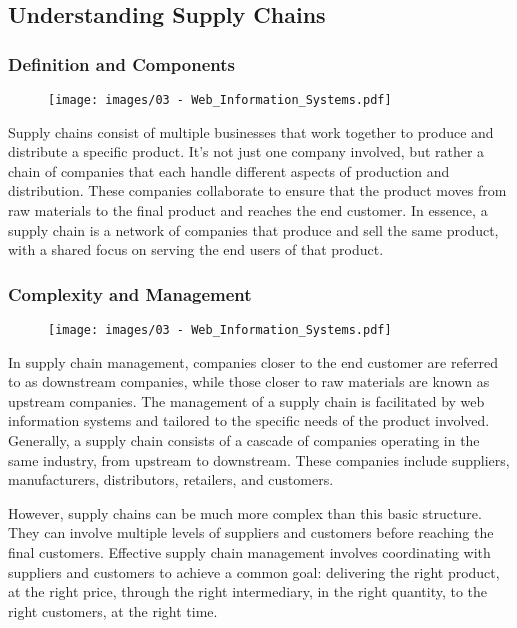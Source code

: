 \subsection{Understanding Supply Chains}\label{understanding-supply-chains}

\subsubsection{Definition and Components}\label{definition-and-components}

\begin{figure}[!h]
  \centering
  \texttt{[image: images/03 - Web\_Information\_Systems.pdf]}
\end{figure}

Supply chains consist of multiple businesses that work together to
produce and distribute a specific product. It's not just one company
involved, but rather a chain of companies that each handle different
aspects of production and distribution. These companies collaborate to
ensure that the product moves from raw materials to the final product
and reaches the end customer. In essence, a supply chain is a network of
companies that produce and sell the same product, with a shared focus on
serving the end users of that product.

\subsubsection{Complexity and Management}\label{complexity-and-management}

\begin{figure}[!h]
  \centering
  \texttt{[image: images/03 - Web\_Information\_Systems.pdf]}
\end{figure}

In supply chain management, companies closer to the end customer are
referred to as downstream companies, while those closer to raw materials
are known as upstream companies. The management of a supply chain is
facilitated by web information systems and tailored to the specific
needs of the product involved. Generally, a supply chain consists of a
cascade of companies operating in the same industry, from upstream to
downstream. These companies include suppliers, manufacturers,
distributors, retailers, and customers.

However, supply chains can be much more complex than this basic
structure. They can involve multiple levels of suppliers and customers
before reaching the final customers. Effective supply chain management
involves coordinating with suppliers and customers to achieve a common
goal: delivering the right product, at the right price, through the
right intermediary, in the right quantity, to the right customers, at
the right time.

